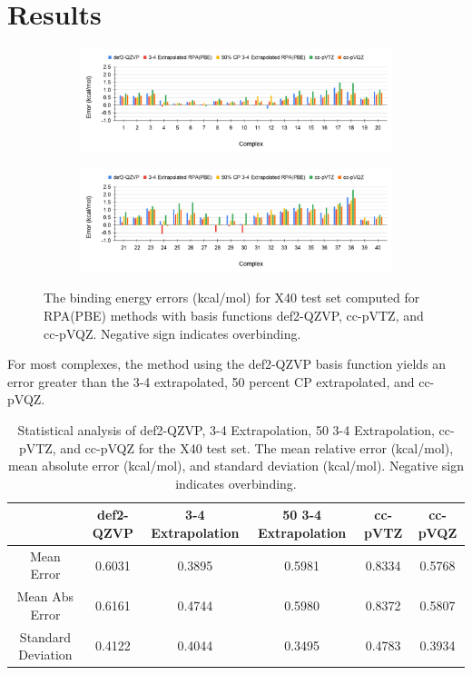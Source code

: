 \documentclass[11pt]{article}
\begin{document}
\section{Results}

\begin{figure}[H]
  \centering
  \begin{subfigure}{\textwidth}
    \center
    \includegraphics[scale=0.35]{def2-QZVP_1.png}
    \label{fig:def2-QZVP_1}
  \end{subfigure}
  \begin{subfigure}{\textwidth}
    \center
    \includegraphics[scale=0.35]{def2-QZVP_2.png}
    \label{fig:def2-QZVP_2}
  \end{subfigure}
  \caption{The binding energy errors (kcal/mol) for X40 test set computed
    for RPA(PBE) methods with basis functions def2-QZVP, cc-pVTZ, and
    cc-pVQZ. Negative sign indicates overbinding.}
  \label{fig:def2-QZVP Error}
\end{figure}

For most complexes, the method using the def2-QZVP basis function yields
an error greater than the 3-4 extrapolated, 50 percent CP
extrapolated, and cc-pVQZ. 

\begin{table}[hbpt]
  \caption{Statistical analysis of def2-QZVP, 3-4 Extrapolation, 50 3-4
    Extrapolation, cc-pVTZ, and cc-pVQZ for the X40 test set. The mean
    relative error (kcal/mol), mean absolute error (kcal/mol), and
    standard deviation (kcal/mol). Negative sign indicates overbinding.}
  \centering
  \begin{tabular}{c|c|c|c|c|c}
    & def2-QZVP & 3-4 Extrapolation & 50 3-4 Extrapolation & cc-pVTZ  &
    cc-pVQZ \\
    \hline\hline
    Mean Error & 0.6031 & 0.3895 & 0.5981 & 0.8334 & 0.5768 \\
    Mean Abs Error & 0.6161 & 0.4744 & 0.5980 & 0.8372 & 0.5807 \\
    Standard Deviation & 0.4122 & 0.4044 & 0.3495 & 0.4783 & 0.3934 \\
  \end{tabular}
  \label{tab:table_1}
\end{table}
\end{document}
